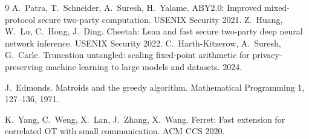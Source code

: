 \documentclass[10pt,a4paper]{article}
\begin{document}
\begin{thebibliography}{9}\small
{} A.~Patra, T.~Schneider, A.~Suresh, H.~Yalame. ABY2.0: Improved mixed-protocol secure
  two-party computation. USENIX Security 2021.
 Z.~Huang, W.~Lu, C.~Hong, J.~Ding. Cheetah: Lean and fast secure two-party deep neural
  network inference. USENIX Security 2022.
 C.~Harth-Kitzerow, A.~Suresh, G.~Carle. Truncation untangled: scaling fixed-point arithmetic for
privacy-preserving machine learning to large models and datasets. 2024.

 J.~Edmonds. Matroids and the greedy algorithm. Mathematical Programming 1, 127--136, 1971.

 K.~Yang, C.~Weng, X.~Lan, J.~Zhang, X.~Wang. Ferret: Fast extension for correlated OT
  with small communication. ACM CCS 2020.
\end{thebibliography}
\end{document}
